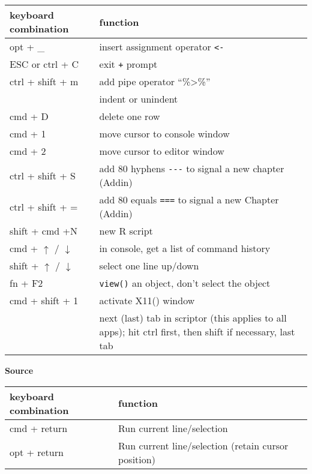 \documentclass[
]{book}
\begin{document}
\begin{longtable}[]{@{}
  >{\raggedright\arraybackslash}p{}
  >{\raggedright\arraybackslash}p{}@{}}
\toprule\noalign{}
\begin{minipage}[b]{\linewidth}\raggedright
keyboard combination
\end{minipage} & \begin{minipage}[b]{\linewidth}\raggedright
function
\end{minipage} \\
\midrule\noalign{}
\endhead
\bottomrule\noalign{}
\endlastfoot
opt + \_ & insert assignment operator \texttt{\textless{}-} \\
ESC or ctrl + C & exit \texttt{+} prompt \\
ctrl + shift + m & add pipe operator ``\%\textgreater\%'' \\
{ctrl + \texttt{{[}}/\texttt{{]}} } & indent or unindent \\
cmd + D & delete one row \\
cmd + 1 & move cursor to console window \\
cmd + 2 & move cursor to editor window \\
ctrl + shift + S & add 80 hyphens \texttt{-\/-\/-} to signal a new chapter (Addin) \\
ctrl + shift + = & add 80 equals \texttt{===} to signal a new Chapter (Addin) \\
shift + cmd +N & new R script \\
cmd + \(\uparrow\) / \(\downarrow\) & in console, get a list of command history \\
shift + \(\uparrow\) / \(\downarrow\) & select one line up/down \\
fn + F2 & \texttt{view()} an object, don't select the object \\
cmd + shift + 1 & activate X11() window \\
{ctrl (+ shift) + tab} & next (last) tab in scriptor (this applies to all apps); hit ctrl first, then shift if necessary, last tab \\
\end{longtable}

{\textbf{Source}}

\begin{longtable}[]{@{}
  >{\raggedright\arraybackslash}p{}
  >{\raggedright\arraybackslash}p{}@{}}
\toprule\noalign{}
\begin{minipage}[b]{\linewidth}\raggedright
keyboard combination
\end{minipage} & \begin{minipage}[b]{\linewidth}\raggedright
function
\end{minipage} \\
\midrule\noalign{}
\endhead
\bottomrule\noalign{}
\endlastfoot
cmd + return & Run current line/selection \\
opt + return & Run current line/selection (retain cursor position) \\
\end{longtable}
\end{document}
